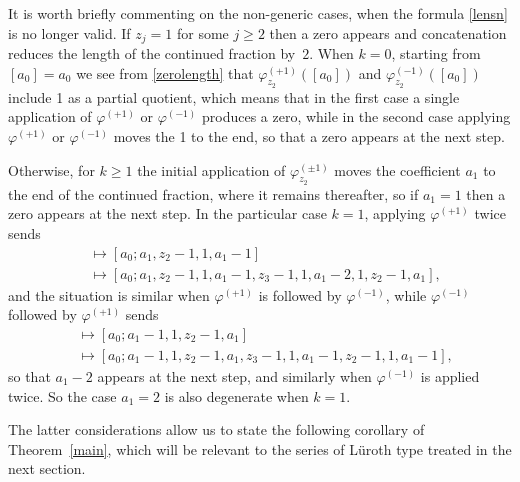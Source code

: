 \documentclass[12pt,a4paper]{amsart}
\theoremstyle{definition}
\numberwithin{equation}{section}
\begin{document}
It is worth briefly commenting on the non-generic cases, when the formula \eqref{lensn} 
is no longer valid. %
If $z_j=1$ for some $j\geq 2$ then 
a zero appears and concatenation reduces the length of the continued fraction by~$2$. 
When $k=0$, starting from $[a_0] = a_0$ we see from \eqref{zerolength} 
that $\varphi_{z_2}^{(+1)} ( [a_0])$ and $\varphi_{z_2}^{(-1)} ( [a_0])$ include   
1 as a partial quotient, which means that in the first case a single application of  
$\varphi^{(+1)}$ or $\varphi^{(-1)}$ produces a zero, while in the second case applying $\varphi^{(+1)}$ or $\varphi^{(-1)}$ moves the 1 
to the end, so that a zero appears at the next step. 

Otherwise, for $k\geq 1$ the initial application of 
$\varphi_{z_2}^{(\pm1)}$ moves the coefficient $a_1$ to the end of the continued fraction, where it remains 
thereafter, so if 
$a_1=1$ then a zero appears at the next step. 
%
In the particular case $k=1$, applying $\varphi^{(+1)}$ twice sends 
\begin{align*} 
[a_0; a_1] & \mapsto [a_0;a_1,z_2-1,1,a_1-1] 
\\ 
& \mapsto [a_0;a_1,z_2-1,1,a_1-1,z_3-1,1,a_1-2,1,z_2-1,a_1], 
\end{align*}
and the situation is similar 
when $\varphi^{(+1)}$ is followed by 
$\varphi^{(-1)}$,  
while $\varphi^{(-1)}$ followed by 
$\varphi^{(+1)}$ sends 
\begin{align*} 
[a_0; a_1] & \mapsto [a_0;a_1-1,1, z_2-1,a_1] \\ 
& \mapsto [a_0;a_1-1,1,z_2-1,a_1,z_3-1,1,a_1-1,z_2-1,1,a_1-1],
\end{align*}
so that $a_1-2$ appears at the next step, and similarly when $\varphi^{(-1)}$ is applied twice. So 
the case $a_1=2$ is also degenerate when $k=1$. 

The latter considerations allow us to state the following corollary of Theorem~\ref{main}, 
which will be relevant to the series of L\"uroth type treated in the next section. 
\end{document}

